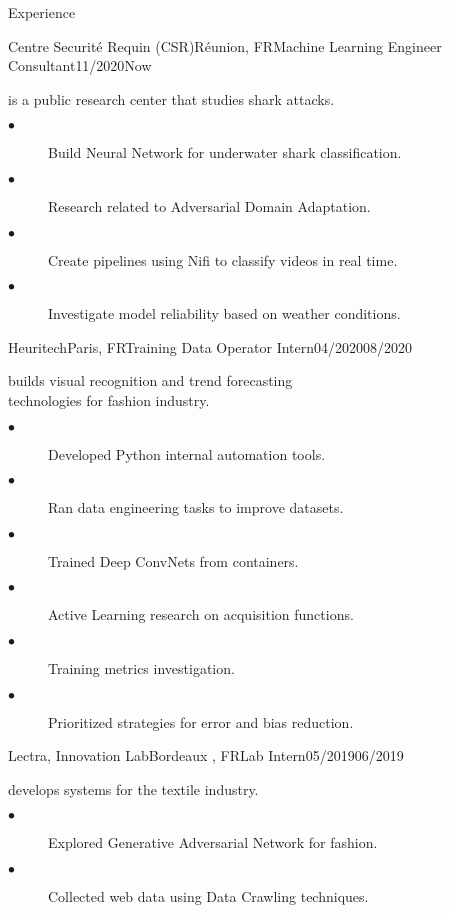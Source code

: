 \documentclass{resume}
\begin{document}
\begin{multicols}{2}
\begin{rSection}{\Large Experience}
		\begin{job}{Centre Securité Requin (CSR)}{Réunion, FR}{Machine Learning Engineer Consultant}{11/2020}{Now}{
			is a public research center that studies shark attacks.
			\begin{description}
				\item[$\bullet$] Build Neural Network for underwater shark classification.
				\item[$\bullet$] Research related to Adversarial Domain Adaptation.
				\item[$\bullet$] Create pipelines using Nifi to classify videos in real time.
				\item[$\bullet$] Investigate model reliability based on weather conditions.
			\end{description}
		}
		\end{job}

		\begin{job}{Heuritech}{Paris, FR}{Training Data Operator Intern}{04/2020}{08/2020}{
			builds visual recognition and trend forecasting \\ technologies for fashion industry.
			\begin{description}
				\item[$\bullet$] Developed Python internal automation tools.
				\item[$\bullet$] Ran data engineering tasks to improve datasets. 
				\item[$\bullet$] Trained Deep ConvNets from containers.
				\item[$\bullet$] Active Learning research on acquisition functions.
				\item[$\bullet$] Training metrics investigation.
				\item[$\bullet$] Prioritized strategies for error and bias reduction.
			\end{description}
		}
		\end{job}
		\begin{job}{Lectra, Innovation Lab}{Bordeaux , FR}{Lab Intern}{05/2019}{06/2019}{
			develops systems for the textile industry.
			\begin{description}
				\item[$\bullet$] Explored Generative Adversarial Network for fashion.
				\item[$\bullet$] Collected web data using Data Crawling techniques.
			\end{description}
		}
		\end{job}
	\end{rSection}
	

\end{multicols}
\end{document}

